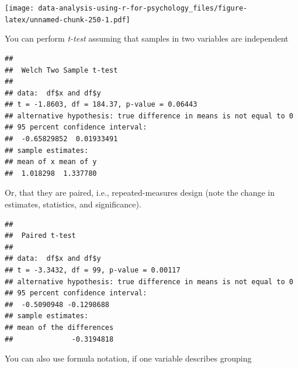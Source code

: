 \documentclass[
]{book}
\newenvironment{Shaded}{\begin{snugshade}}{\end{snugshade}}
\newcommand{\AttributeTok}[1]{\textcolor[rgb]{0.77,0.63,0.00}{#1}}
\newcommand{\ConstantTok}[1]{\textcolor[rgb]{0.00,0.00,0.00}{#1}}
\newcommand{\DecValTok}[1]{\textcolor[rgb]{0.00,0.00,0.81}{#1}}
\newcommand{\FunctionTok}[1]{\textcolor[rgb]{0.00,0.00,0.00}{#1}}
\newcommand{\NormalTok}[1]{#1}
\newcommand{\OtherTok}[1]{\textcolor[rgb]{0.56,0.35,0.01}{#1}}
\newcommand{\SpecialCharTok}[1]{\textcolor[rgb]{0.00,0.00,0.00}{#1}}
\newcommand{\StringTok}[1]{\textcolor[rgb]{0.31,0.60,0.02}{#1}}
\begin{document}
\texttt{[image: data-analysis-using-r-for-psychology\_files/figure-latex/unnamed-chunk-250-1.pdf]}

You can perform \emph{t-test} assuming that samples in two variables are independent

\begin{Shaded}
\end{Shaded}

\begin{verbatim}
## 
##  Welch Two Sample t-test
## 
## data:  df$x and df$y
## t = -1.8603, df = 184.37, p-value = 0.06443
## alternative hypothesis: true difference in means is not equal to 0
## 95 percent confidence interval:
##  -0.65829852  0.01933491
## sample estimates:
## mean of x mean of y 
##  1.018298  1.337780
\end{verbatim}

Or, that they are paired, i.e., repeated-measures design (note the change in estimates, statistics, and significance).

\begin{Shaded}
\end{Shaded}

\begin{verbatim}
## 
##  Paired t-test
## 
## data:  df$x and df$y
## t = -3.3432, df = 99, p-value = 0.00117
## alternative hypothesis: true difference in means is not equal to 0
## 95 percent confidence interval:
##  -0.5090948 -0.1298688
## sample estimates:
## mean of the differences 
##              -0.3194818
\end{verbatim}

You can also use formula notation, if one variable describes grouping

\begin{Shaded}
\end{Shaded}
\end{document}
